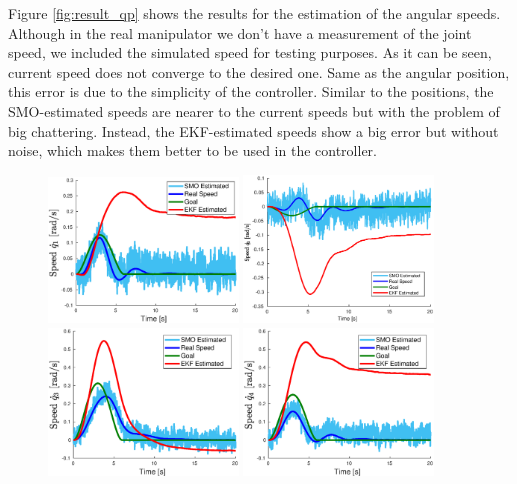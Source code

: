 \documentclass[a4paper, 10pt]{article}
\begin{document}
Figure \ref{fig:result_qp} shows the results for the estimation of the angular speeds. Although in the real manipulator we don't have a measurement of the joint speed, we included the simulated speed for testing purposes. As it can be seen, current speed does not converge to the desired one. Same as the angular position, this error is due to the simplicity of the controller. Similar to the positions, the SMO-estimated speeds are nearer to the current speeds but with the problem of big chattering. Instead, the EKF-estimated speeds show a big error but without noise, which makes them better to be used in the controller. 
\begin{figure}
  \centering
  \includegraphics[width=0.45\textwidth]{Figures/result_qp1.eps}
  \includegraphics[width=0.45\textwidth]{Figures/result_qp2.eps}
  \includegraphics[width=0.45\textwidth]{Figures/result_qp3.eps}
  \includegraphics[width=0.45\textwidth]{Figures/result_qp4.eps}

\end{figure}
\end{document}
